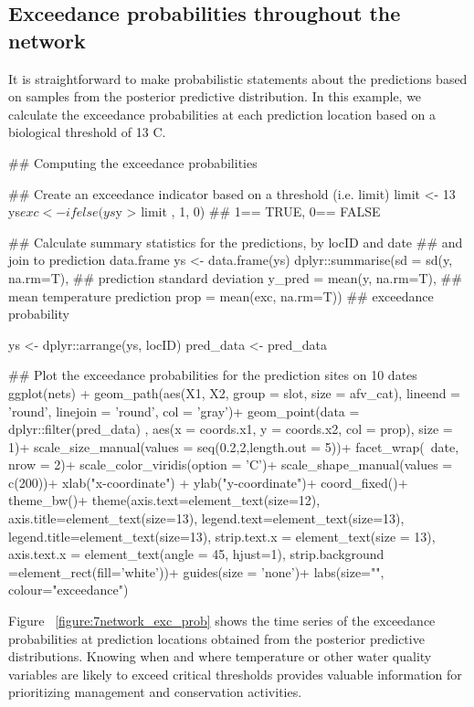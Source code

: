 \subsection*{Exceedance probabilities throughout the network}
It is straightforward to make probabilistic statements about the predictions based on samples from the posterior predictive distribution. 
In this example, we calculate the exceedance probabilities at each prediction location based on a biological threshold of 13 \textdegree{}C. 

\begin{example}
## Computing the exceedance probabilities

## Create an exceedance indicator based on a threshold (i.e. limit)
limit <- 13
ys$exc <- ifelse(ys$y > limit , 1, 0) ## 1== TRUE, 0== FALSE

## Calculate summary statistics for the predictions, by locID and date
## and join to prediction data.frame
ys <- data.frame(ys) %
  dplyr::summarise(sd = sd(y, na.rm=T), ## prediction standard deviation
                   y_pred = mean(y, na.rm=T), ## mean temperature prediction
                   prop = mean(exc, na.rm=T)) ## exceedance probability

ys <- dplyr::arrange(ys, locID)
pred_data <- pred_data %


## Plot the exceedance probabilities for the prediction sites on 10 dates
ggplot(nets) +
  geom_path(aes(X1, X2, group = slot, size = afv_cat), lineend = 'round',
              linejoin = 'round', col = 'gray')+
  geom_point(data = dplyr::filter(pred_data) ,
             aes(x = coords.x1, y = coords.x2, col = prop), size = 1)+
  scale_size_manual(values = seq(0.2,2,length.out = 5))+
  facet_wrap(~date, nrow = 2)+
  scale_color_viridis(option = 'C')+
  scale_shape_manual(values = c(200))+
  xlab("x-coordinate") +
  ylab("y-coordinate")+
  coord_fixed()+
  theme_bw()+
  theme(axis.text=element_text(size=12),
        axis.title=element_text(size=13),
        legend.text=element_text(size=13),
        legend.title=element_text(size=13),
        strip.text.x = element_text(size = 13),
        axis.text.x = element_text(angle = 45, hjust=1),
        strip.background =element_rect(fill='white'))+
  guides(size = 'none')+
    labs(size="", colour="exceedance")
\end{example}

Figure ~\ref{figure:7network_exc_prob} shows the time series of the exceedance probabilities at prediction locations obtained from the posterior predictive distributions. Knowing when and where temperature or other water quality variables are likely  to exceed critical thresholds provides valuable information for prioritizing management and conservation activities.  


